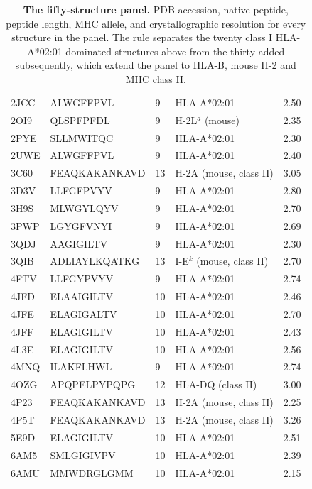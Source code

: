 \documentclass[letterpaper]{article}
\begin{document}
\begin{table}[p]
\begin{tabular}{lllll}
2JCC & ALWGFFPVL & 9 & HLA-A*02:01 & 2.50 \\
2OI9 & QLSPFPFDL & 9 & H-2L$^d$ (mouse) & 2.35 \\
2PYE & SLLMWITQC & 9 & HLA-A*02:01 & 2.30 \\
2UWE & ALWGFFPVL & 9 & HLA-A*02:01 & 2.40 \\
3C60 & FEAQKAKANKAVD & 13 & H-2A (mouse, class II) & 3.05 \\
3D3V & LLFGFPVYV & 9 & HLA-A*02:01 & 2.80 \\
3H9S & MLWGYLQYV & 9 & HLA-A*02:01 & 2.70 \\
3PWP & LGYGFVNYI & 9 & HLA-A*02:01 & 2.69 \\
3QDJ & AAGIGILTV & 9 & HLA-A*02:01 & 2.30 \\
3QIB & ADLIAYLKQATKG & 13 & I-E$^k$ (mouse, class II) & 2.70 \\
4FTV & LLFGYPVYV & 9 & HLA-A*02:01 & 2.74 \\
4JFD & ELAAIGILTV & 10 & HLA-A*02:01 & 2.46 \\
4JFE & ELAGIGALTV & 10 & HLA-A*02:01 & 2.70 \\
4JFF & ELAGIGILTV & 10 & HLA-A*02:01 & 2.43 \\
4L3E & ELAGIGILTV & 10 & HLA-A*02:01 & 2.56 \\
4MNQ & ILAKFLHWL & 9 & HLA-A*02:01 & 2.74 \\
4OZG & APQPELPYPQPG & 12 & HLA-DQ (class II) & 3.00 \\
4P23 & FEAQKAKANKAVD & 13 & H-2A (mouse, class II) & 2.25 \\
4P5T & FEAQKAKANKAVD & 13 & H-2A (mouse, class II) & 3.26 \\
5E9D & ELAGIGILTV & 10 & HLA-A*02:01 & 2.51 \\
6AM5 & SMLGIGIVPV & 10 & HLA-A*02:01 & 2.39 \\
6AMU & MMWDRGLGMM & 10 & HLA-A*02:01 & 2.15 \\
\bottomrule
\end{tabular}
\caption{\textbf{The fifty-structure panel.} PDB accession, native peptide,
peptide length, MHC allele, and crystallographic resolution for every structure in the panel.
The rule separates the twenty class I HLA-A*02:01-dominated structures above from the thirty
added subsequently, which extend the panel to HLA-B, mouse H-2 and MHC class II.}
\label{tab:pdblist}
\end{table}
\end{document}
